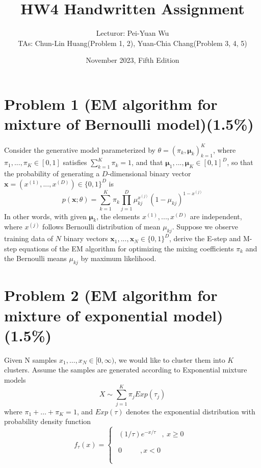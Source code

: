 \documentclass{article}
\title{HW4 Handwritten Assignment}
\author{Lecturor: Pei-Yuan Wu\\
TAs: {Chun-Lin Huang(Problem 1, 2), Yuan-Chia Chang(Problem 3, 4, 5)}}
\date{November 2023, Fifth Edition}
\def\vecx{{\mathbf x}}
\def\vecmu{{\boldsymbol \mu}}
\begin{document}
\maketitle

\section*{Problem 1 (EM algorithm for mixture of Bernoulli model)(1.5\%)}
Consider the generative model parameterized by $\theta = (\pi_k,\vecmu_k)_{k=1}^K$, where $\pi_1,...,\pi_K \in [0,1]$ satisfies $\sum_{k=1}^K\pi_k = 1$, and that $\vecmu_1,...,\vecmu_K  \in [0,1]^D$, so that the probability of generating a $D$-dimensional binary vector $\vecx = (x^{(1)},...,x^{(D)}) \in \{0,1\}^D$ is
\begin{equation*}
p(\vecx; \theta) = \sum_{k=1}^K \pi_k \prod_{j=1}^D \mu_{kj}^{x^{(j)}}(1-\mu_{kj})^{1-x^{(j)}}
\end{equation*}
%
In other words, with given $\vecmu_k$, the elements $x^{(1)},...,x^{(D)}$ are independent, where $x^{(j)}$ follows Bernoulli distribution of mean $\mu_{kj}$.  Suppose we observe training data of $N$ binary vectors $\vecx_1,...,\vecx_N \in \{0,1\}^D$, derive the E-step and M-step equations of the EM algorithm for optimizing the mixing coefficients $\pi_k$ and the Bernoulli means $\mu_{kj}$ by maximum likelihood.

\section*{Problem 2 (EM algorithm for mixture of exponential model)(1.5\%)}
Given N samples \(x_{1},\ldots,x_{N} \in \lbrack 0,\infty)\), we would
like to cluster them into \(K\) clusters. Assume the samples are
generated according to Exponential mixture models
\[X\sim\sum_{j = 1}^{K}{\pi_{j}Exp(\tau_{j})}\]
where \(\pi_{1} + \ldots + \pi_{K} = 1\), and \(Exp(\tau)\) denotes the
exponential distribution with probability density function
\[f_{\tau}(x) = \left\{ \begin{matrix}
\begin{matrix}
(1/\tau)e^{- x/\tau} & ,\ x \geq 0 \\
\end{matrix} \\
\begin{matrix}
0\ \ \ \ \ \ \ \  & ,x < 0 \\
\end{matrix} \\
\end{matrix} \right.\ \]
\end{document}
